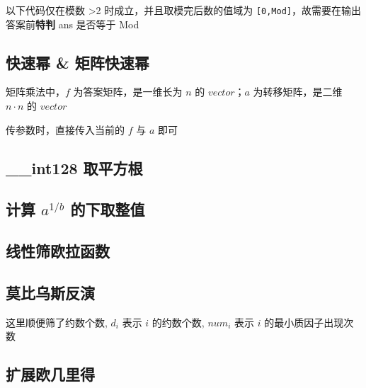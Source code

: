 \documentclass[12pt]{article}
\begin{document}
以下代码仅在模数 >2 时成立，并且取模完后数的值域为 \texttt{[0,Mod]}，故需要在输出答案前\textbf{特判} ans 是否等于 Mod



\newpage

\subsection{快速幂 \& 矩阵快速幂}

矩阵乘法中，$f$ 为答案矩阵，是一维长为 $n$ 的 $vector$；$a$ 为转移矩阵，是二维 $n\cdot n$ 的 $vector$

传参数时，直接传入当前的 $f$ 与 $a$ 即可



\newpage

\subsection{\_{}\_{}int128 取平方根}



\newpage

\subsection{计算 $a^{1/b}$ 的下取整值}



\subsection{线性筛欧拉函数}



\newpage

\subsection{莫比乌斯反演}

这里顺便筛了约数个数, $d_i$ 表示 $i$ 的约数个数, $num_i$ 表示 $i$ 的最小质因子出现次数



\newpage

\subsection{扩展欧几里得}
\end{document}

